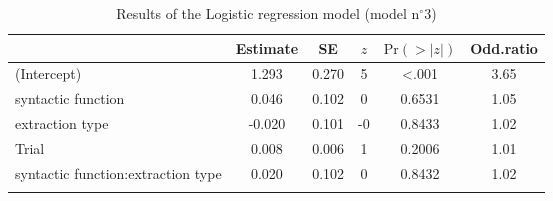 \begin{table}
\begin{tabularx}{\textwidth}{Q S[table-format=-1.3] S[table-format=1.3] S[table-format=-1] S[table-format=<1.4] S[table-format=1.2]}
  \lsptoprule
 & {Estimate} & {SE} & {$z$} & {$\text{Pr}(>|z|)$} & {Odd.ratio} \\ 
  \midrule
(Intercept) & 1.293 & 0.270 & 5 & <.001 & 3.65 \\ 
  syntactic function & 0.046 & 0.102 & 0 & 0.6531 & 1.05 \\ 
  extraction type & -0.020 & 0.101 & -0 & 0.8433 & 1.02 \\ 
  Trial & 0.008 & 0.006 & 1 & 0.2006 & 1.01 \\ 
  syntactic function:extraction type & 0.020 & 0.102 & 0 & 0.8432 & 1.02 \\ 
   \lspbottomrule
\end{tabularx}
\caption{Results of the Logistic regression model (model n$^{\circ}$3)}
\label{tab:exp02-m3}
\end{table}
